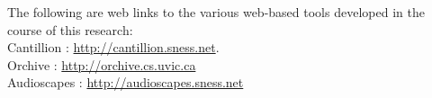 \label{chapter:weblinks}

The following are web links to the various web-based tools developed
in the course of this research:
\\

Cantillion : \url{http://cantillion.sness.net}.
\\

Orchive : \url{http://orchive.cs.uvic.ca}
\\

Audioscapes : \url{http://audioscapes.sness.net}
\\
